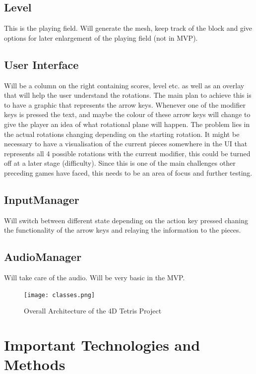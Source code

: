 \documentclass{article}
\begin{document}
\subsection{Level}
This is the playing field. Will generate the mesh, keep track of the block and give options for later enlargement of the playing field (not in MVP).
\subsection{User Interface}
Will be a column on the right containing scores, level etc. as well as an overlay that will help the user understand the rotations.
The main plan to achieve this is to have a graphic that represents the arrow keys. Whenever one of the modifier keys is pressed the text, and maybe the colour of these arrow keys will change to give the player an idea of what rotational plane will happen. The problem lies in the actual rotations changing depending on the starting rotation. It might be necessary to have a visualisation of the current pieces somewhere in the UI that represents all 4 possible rotations with the current modifier, this could be turned off at a later stage (difficulty). Since this is one of the main challenges other preceding games have faced, this needs to be an area of focus and further testing. 
\subsection{InputManager}
Will switch between different state depending on the action key pressed chaning the functionality of the arrow keys and relaying the information to the pieces.
\subsection{AudioManager}
Will take care of the audio. Will be very basic in the MVP.


\begin{figure}[H]
    \centering
    \texttt{[image: classes.png]}
    \caption{Overall Architecture of the 4D Tetris Project}
    \label{fig:architecture}
\end{figure}

\section{Important Technologies and Methods}
\end{document}
